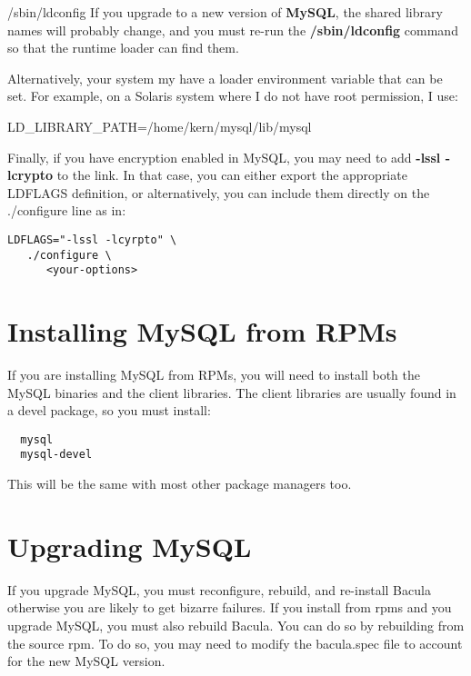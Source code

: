 /sbin/ldconfig If you upgrade to a new version of {\bf MySQL}, the shared
library names will probably change, and you must re-run the {\bf
/sbin/ldconfig} command so that the runtime loader can find them. 

Alternatively, your system my have a loader environment variable that can be
set. For example, on a Solaris system where I do not have root permission, I
use: 

LD\_LIBRARY\_PATH=/home/kern/mysql/lib/mysql 

Finally, if you have encryption enabled in MySQL, you may need to add {\bf
-lssl -lcrypto} to the link. In that case, you can either export the
appropriate LDFLAGS definition, or alternatively, you can include them
directly on the ./configure line as in: 

\footnotesize
\begin{verbatim}
LDFLAGS="-lssl -lcyrpto" \
   ./configure \
      <your-options>
\end{verbatim}
\normalsize

\section{Installing MySQL from RPMs}
If you are installing MySQL from RPMs, you will need to install
both the MySQL binaries and the client libraries.  The client
libraries are usually found in a devel package, so you must
install:

\footnotesize
\begin{verbatim}
  mysql
  mysql-devel
\end{verbatim}
\normalsize

This will be the same with most other package managers too.

\section{Upgrading MySQL}
\index[general]{Upgrading}
If you upgrade MySQL, you must reconfigure, rebuild, and re-install 
Bacula otherwise you are likely to get bizarre failures.  If you
install from rpms and you upgrade MySQL, you must also rebuild Bacula.
You can do so by rebuilding from the source rpm. To do so, you may need
to modify the bacula.spec file to account for the new MySQL version.
